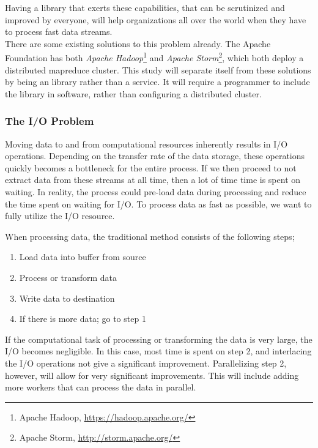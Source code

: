 \documentclass[a4paper]{article}
\begin{document}
Having a library that exerts these capabilities, that can be scrutinized and improved by everyone, will help organizations all over the world when they have to process fast data streams.\\

There are some existing solutions to this problem already. The Apache Foundation has both \textit{Apache Hadoop}\footnote{Apache Hadoop, \url{https://hadoop.apache.org/}} and \textit{Apache Storm}\footnote{Apache Storm, \url{http://storm.apache.org/}}, which both deploy a distributed mapreduce cluster\cite{Dean:2008:MSD:1327452.1327492}. This study will separate itself from these solutions by being an library rather than a service. It will require a programmer to include the library in software, rather than configuring a distributed cluster.


\subsubsection{The I/O Problem}
Moving data to and from computational resources inherently results in I/O operations. Depending on the transfer rate of the data storage, these operations quickly becomes a bottleneck for the entire process. If we then proceed to not extract data from these streams at all time, then a lot of time time is spent on waiting. In reality, the process could pre-load data during processing and reduce the time spent on waiting for I/O. To process data as fast as possible, we want to fully utilize the I/O resource. 

When processing data, the traditional method consists of the following steps;

\begin{enumerate}
\item Load data into buffer from source
\item Process or transform data
\item Write data to destination
\item If there is more data; go to step 1
\end{enumerate}

If the computational task of processing or transforming the data is very large, the I/O becomes negligible. In this case, most time is spent on step 2, and interlacing the I/O operations not give a significant improvement. Parallelizing step 2, however, will allow for very significant improvements. This will include adding more workers that can process the data in parallel.
\end{document}
